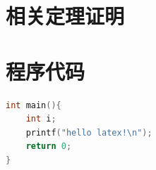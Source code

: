 \begin{appendices}
\section{相关定理证明}

\section{程序代码}


\begin{lstlisting}[language=C++]
int main(){
    int i;
    printf("hello latex!\n");
    return 0;
}
\end{lstlisting}







%
\end{appendices}
